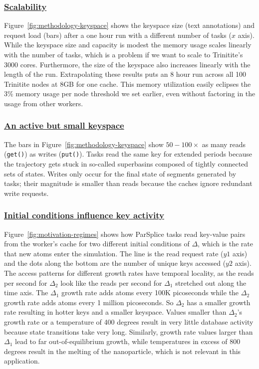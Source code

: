 \subsubsection{\underline{Scalability}} Figure~\ref{fig:methodology-keyspace} shows the
keyspace size (text annotations) and request load (bars) after a one hour run
with a different number of tasks (\(x\) axis). While the keyspace size and
capacity is modest the memory usage scales linearly with the number
of tasks, which is a problem if we want to scale to Trinitite's 3000 cores.
Furthermore, the size of the keyspace also increases linearly with the length
of the run.  Extrapolating these results puts an 8 hour run across all 100
Trinitite nodes at 8GB for one cache.  This memory utilization easily eclipses
the 3\% memory usage per node threshold we set earlier, even without factoring
in the usage from other workers.

\subsubsection{\underline{An active but small keyspace}}

The bars in Figure~\ref{fig:methodology-keyspace} show \(50-100\times\) as many
reads (\texttt{get()}) as writes (\texttt{put()}).  Tasks read the same key for
extended periods because the trajectory gets stuck in so-called superbasins
composed of tightly connected sets of states.  Writes only occur for the final
state of segments generated by tasks; their magnitude is smaller than reads
because the caches ignore redundant write requests. 

\subsubsection{\underline{Initial conditions influence key activity}}
\label{sec:delta}
Figure~\ref{fig:motivation-regimes} shows how ParSplice tasks read key-value
pairs from the worker's cache for two different initial conditions of
\(\Delta\), which is the rate that new atoms enter the simulation.  The line is
the read request rate (\(y1\) axis) and the dots along the bottom are the
number of unique keys accessed (\(y2\) axis).  The access patterns for
different growth rates have temporal locality, as the reads per second for
\(\Delta_2\) look like the reads per second for \(\Delta_1\) stretched out
along the time axis.  The \(\Delta_1\) growth rate adds atoms every 100K
picoseconds while the \(\Delta_2\) growth rate adds atoms every 1 million
picoseconds. So \(\Delta_2\) has a smaller growth rate resulting in hotter
keys and a smaller keyspace.  Values smaller than \(\Delta_2\)'s growth rate or
a temperature of 400 degrees result in very little database activity because
state transitions take very long. Similarly, growth rate values larger than \(\Delta_1\)
lead to far out-of-equilibrium growth, while temperatures in excess of 800 degrees
result in the melting of the nanoparticle, which is not relevant in this application.

